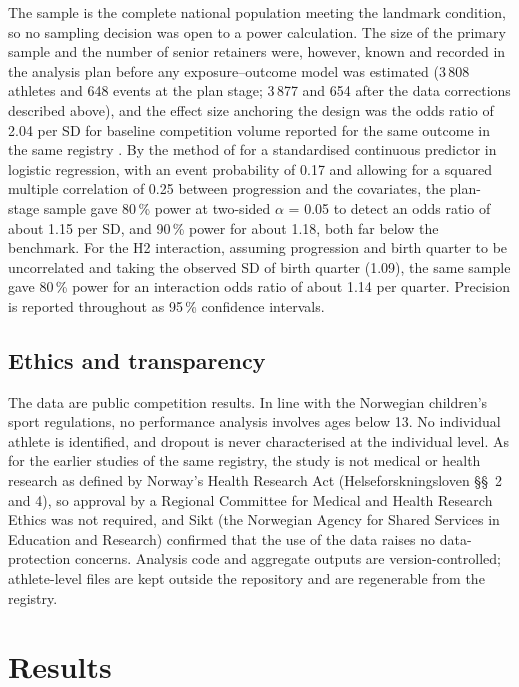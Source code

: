 \documentclass[12pt,a4paper]{article}
\begin{document}
The sample is the complete national population meeting the landmark condition, so no sampling decision was open to a power calculation. The size of the primary sample and the number of senior retainers were, however, known and recorded in the analysis plan before any exposure--outcome model was estimated (3\,808 athletes and 648 events at the plan stage; 3\,877 and 654 after the data corrections described above), and the effect size anchoring the design was the odds ratio of 2.04 per SD for baseline competition volume reported for the same outcome in the same registry \citep{guttormsen2026dropout}. By the method of \citet{hsieh1998} for a standardised continuous predictor in logistic regression, with an event probability of 0.17 and allowing for a squared multiple correlation of 0.25 between progression and the covariates, the plan-stage sample gave 80\,\% power at two-sided $\alpha$ = 0.05 to detect an odds ratio of about 1.15 per SD, and 90\,\% power for about 1.18, both far below the benchmark. For the H2 interaction, assuming progression and birth quarter to be uncorrelated and taking the observed SD of birth quarter (1.09), the same sample gave 80\,\% power for an interaction odds ratio of about 1.14 per quarter. Precision is reported throughout as 95\,\% confidence intervals.

\subsection{Ethics and transparency}

The data are public competition results. In line with the Norwegian children's sport regulations, no performance analysis involves ages below 13. No individual athlete is identified, and dropout is never characterised at the individual level. As for the earlier studies of the same registry, the study is not medical or health research as defined by Norway's Health Research Act (Helseforskningsloven \S\S~2 and 4), so approval by a Regional Committee for Medical and Health Research Ethics was not required, and Sikt (the Norwegian Agency for Shared Services in Education and Research) confirmed that the use of the data raises no data-protection concerns. Analysis code and aggregate outputs are version-controlled; athlete-level files are kept outside the repository and are regenerable from the registry.

\section{Results}
\end{document}
